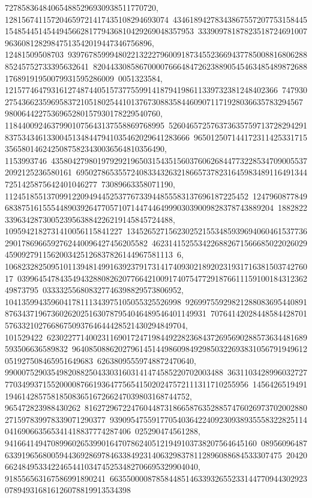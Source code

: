 {{{727858364840654885296930938511770720, 128156741157204659721417435108294693074\
43461894278343867557207753158445154854451454494566281779436810429269048357953\
3339097818782351872469100796360812829847513542019447346756896, 12481509508703\
93976785999480221322279600918734552366943778500881680628885245752733395632641\
82044330858670000766648472623889054546348548987268817689191950079931595286009\
0051323584, 12157746479316127487440515737755991418794198611339732381248402366\
74793027543662359695837210518025441013767308835844609071171928036635783294567\
9800644227536965280157930178229540760, 11844009246379901075643137558869768995\
52604657257637363575971372829429183753434613300451348447941035462029641283666\
96501250714417231142533171535658014624250875823430036564810356490, 1153993746\
43580427980197929219650315435156037606268447732285347090055372092125236580161\
69502786535572408334326321866573782316459834891164913447251425875642401046277\
73089663358071190, 1124518551370991220949445253776733944855583137696187225452\
12479608778496838751615554489039264770571071447446499903039009828378743889204\
18828223396342873005239563884226219145845724488, 1095942182731410056115841227\
13452652715623025215534859396940604615377362901786966592762440096427456205582\
46231415255342268826715666850220260294590927911562003425126837826144967581113\
6, 10682328250951011394814991639237917314174093021892023193171638150374276017\
03996454784354943288082620776642100917407547729187661115910018431236249873795\
033332556808327746398829573806952, 104135994359604178111343975105055325526998\
92699755929821288083695440891876343719673602620251630787954046489546401149931\
707641420284485844287015763321027668675093764644428521430294849704, 101529422\
62302277140023116901724719844922823684372695690288573634481689593506636589832\
96408508862027961451449860984929850322693831056791949612051927508465951649683\
62638095559748872470640, 9900075290354982088250433031603141474585220702003488\
36311034289960327277703499371552000087661936477565415020247572111311710255956\
145642651949119461428575818508365167266247039803168744752, 965472823988430262\
81627296722476044873186658763528857476026973702002880271597839978339071290377\
93909547559177054036422409230938935558322825114041690663565341418837774287406\
025290474561288, 941664149470899602653990164707862405121949103738207564645160\
08956096487633919656800594436928697846338492314063298378112896088684533307475\
204206624849533422465441034745253482706695329904040, 918556563167586991890241\
66355000087858448514633932655233144770944302923078949316816126078819913534398\
}}}
